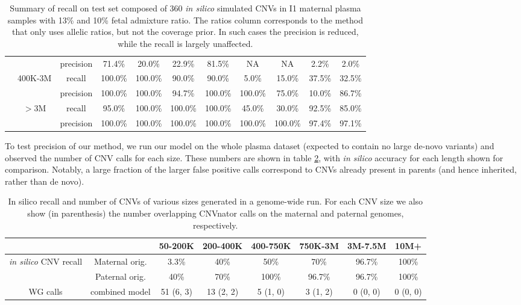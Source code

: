 \begin{table}[t]
\begin{tabular}{c|c|c||c|c||c|c||c|c||c|c}
    &        &    precision    &    71.4\%    &    20.0\%    &    22.9\%    &    81.5\%    &    NA    &    NA    &    2.2\%    &    2.0\%    \\    
    &    400K-3M    &    recall    &    100.0\%    &    100.0\%    &    90.0\%    &    90.0\%    &    5.0\%    &    15.0\%    &    37.5\%    &    32.5\%    \\    
    &        &    precision    &    100.0\%    &    100.0\%    &    94.7\%    &    100.0\%    &    100.0\%    &    75.0\%    &    10.0\%    &    86.7\%    \\    
    &    $>$3M    &    recall    &    95.0\%    &    100.0\%    &    100.0\%    &    100.0\%    &    45.0\%    &    30.0\%    &    92.5\%    &    85.0\%    \\    
    &        &    precision    &    100.0\%    &    100.0\%    &    100.0\%    &    100.0\%    &    100.0\%    &    100.0\%    &    97.4\%    &    97.1\%    \\   	
\end{tabular}
\vspace{3pt}
\caption{Summary of recall on test set composed of 360 \emph{in silico} simulated CNVs in I1 maternal plasma samples with 13\% and 10\% fetal admixture ratio. The ratios column corresponds to the method that only uses allelic ratios, but not the coverage prior. In such cases the precision is reduced, while the recall is largely unaffected.  }
\label{tab:resRecall} 
\end{table}

To test precision of our method, we run our model on the whole plasma dataset (expected to contain no large de-novo variants) and observed the number of CNV calls for each size. These numbers are shown in table \ref{tab:resWGS}, with \textit{in silico} accuracy for each length shown for comparison. Notably, a large fraction of the larger false positive calls correspond to CNVs already present in parents (and hence inherited, rather than de novo). 


\begin{table}[t]
\centering
\begin{tabular}{c|c|c|c|c|c|c|c}
	&		&	50-200K	&	200-400K	&	400-750K	&	750K-3M	&	3M-7.5M	&	10M+ \\ \hline
\multirow{2}{*}{\emph{in silico} CNV recall}	&	Maternal orig.	&	3.3\%	&	40\%	&	50\%	&	70\%	&	96.7\%	&	100\%	\\
	&	Paternal orig.	&	40\%	&	70\%	&	100\%	&	96.7\%	&	96.7\%	&	100\%	\\ \hline
WG calls	&	combined model	&	51 (6, 3)	&	13 (2, 2)	&	5 (1, 0)	&	3 (1, 2)	&	0 (0, 0)	&	0 (0, 0)	\\
\end{tabular}
\vspace{3pt}
\caption{In silico recall and number of CNVs of various sizes generated in a genome-wide run. For each CNV size we also show (in parenthesis) the number overlapping  CNVnator \cite{abyzov2011cnvnator} calls on the maternal and paternal genomes, respectively.}
\label{tab:resWGS} 
\end{table}
\vspace{1cm}




